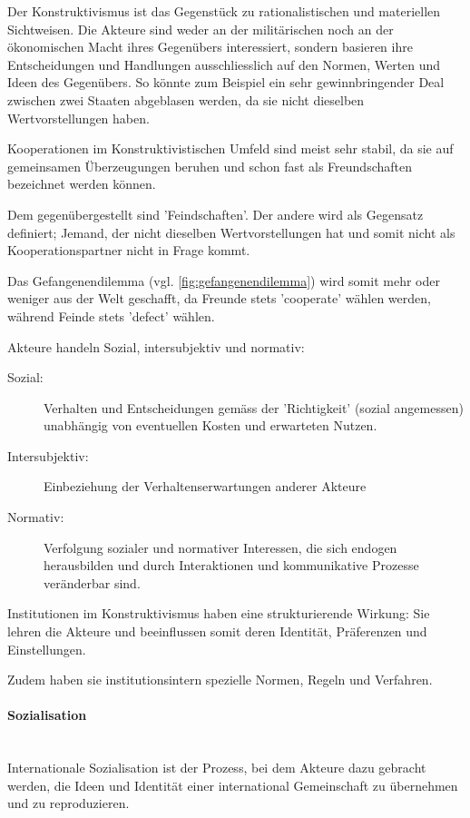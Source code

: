 \documentclass[a4paper, 11pt]{article}
\begin{document}
\noindent Der Konstruktivismus ist das Gegenstück zu rationalistischen und materiellen Sichtweisen. Die Akteure sind weder an der militärischen noch an der ökonomischen Macht ihres Gegenübers interessiert, sondern basieren ihre Entscheidungen und Handlungen ausschliesslich auf den Normen, Werten und Ideen des Gegenübers. So könnte zum Beispiel ein sehr gewinnbringender Deal zwischen zwei Staaten abgeblasen werden, da sie nicht dieselben Wertvorstellungen haben.

\vspace{10px}

\noindent Kooperationen im Konstruktivistischen Umfeld sind meist sehr stabil, da sie auf gemeinsamen Überzeugungen beruhen und schon fast als Freundschaften bezeichnet werden können. 

Dem gegenübergestellt sind 'Feindschaften'. Der andere wird als Gegensatz definiert; Jemand, der nicht dieselben Wertvorstellungen hat und somit nicht als Kooperationspartner nicht in Frage kommt. 

\vspace{10px}

\noindent Das Gefangenendilemma (vgl. \ref{fig:gefangenendilemma}) wird somit mehr oder weniger aus der Welt geschafft, da Freunde stets 'cooperate' wählen werden, während Feinde stets 'defect' wählen.

\noindent Akteure handeln Sozial, intersubjektiv und normativ:

\begin{description}
	\item[Sozial: ] Verhalten und Entscheidungen gemäss der 'Richtigkeit' (sozial angemessen) unabhängig von eventuellen Kosten und erwarteten Nutzen.
	\item[Intersubjektiv: ] Einbeziehung der Verhaltenserwartungen anderer Akteure
	\item[Normativ: ] Verfolgung sozialer und normativer Interessen, die sich endogen herausbilden und durch Interaktionen und kommunikative Prozesse veränderbar sind.
\end{description}

\noindent Institutionen im Konstruktivismus haben eine strukturierende Wirkung: Sie lehren die Akteure und beeinflussen somit deren Identität, Präferenzen und Einstellungen.

Zudem haben sie institutionsintern spezielle Normen, Regeln und Verfahren.

\paragraph{Sozialisation} \mbox{} \\
Internationale Sozialisation ist der Prozess, bei dem Akteure dazu gebracht werden, die Ideen und Identität einer international Gemeinschaft zu übernehmen und zu reproduzieren. 
\end{document}
